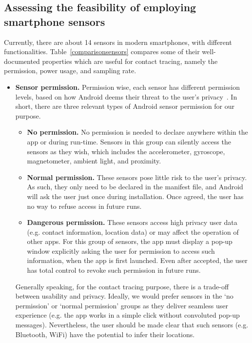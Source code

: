 \documentclass[graybox]{svmult}
\begin{document}
\subsection{Assessing the feasibility of employing smartphone sensors}
Currently, there are about 14 sensors in modern smartphones, with different functionalities. Table~\ref{comparisonsensors} compares some of their well-documented properties which are useful for contact tracing, namely the permission, power usage, and sampling rate.
\begin{itemize}
    \item \textbf{Sensor permission.}
    Permission wise, each sensor has different permission levels, based on how Android deems their threat to the user's privacy~\cite{mehrnezhad2019sensor}. In short, there are three relevant types of Android sensor permission for our purpose.
    \begin{itemize}
        \item \textbf{No permission.} No permission is needed to declare anywhere within the app or during run-time. Sensors in this group can silently access the sensors as they wish, which includes the accelerometer, gyroscope, magnetometer, ambient light, and proximity.
        
        \item \textbf{Normal permission.} These sensors pose little risk to the user's privacy. As such, they only need to be declared in the manifest file, and Android will ask the user just once during installation. Once agreed, the user has no way to refuse access in future runs.
        
        \item \textbf{Dangerous permission.} These sensors access high privacy user data (e.g. contact information, location data) or may affect the operation of other apps. For this group of sensors, the app must display a pop-up window explicitly asking the user for permission to access such information, when the app is first launched. Even after accepted, the user has total control to revoke such permission in future runs.
        
    \end{itemize}

    Generally speaking, for the contact tracing purpose, there is a trade-off between usability and privacy. Ideally, we would prefer sensors in the `no permission' or `normal permission' groups as they deliver seamless user experience (e.g. the app works in a simple click without convoluted pop-up messages). Nevertheless, the user should be made clear that such sensors (e.g. Bluetooth, WiFi) have the potential to infer their locations.


\end{itemize}
\end{document}
